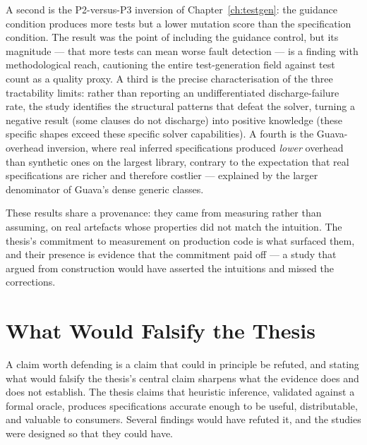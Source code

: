 A second is the P2-versus-P3 inversion of Chapter~\ref{ch:testgen}: the guidance
condition produces more tests but a lower mutation score than the specification
condition. The result was the point of including the guidance control, but its
magnitude --- that more tests can mean worse fault detection --- is a finding with
methodological reach, cautioning the entire test-generation field against test
count as a quality proxy. A third is the precise characterisation of the three
tractability limits: rather than reporting an undifferentiated discharge-failure
rate, the study identifies the structural patterns that defeat the solver, turning
a negative result (some clauses do not discharge) into positive knowledge (these
specific shapes exceed these specific solver capabilities). A fourth is the
Guava-overhead inversion, where real inferred specifications produced \emph{lower}
overhead than synthetic ones on the largest library, contrary to the expectation
that real specifications are richer and therefore costlier --- explained by the
larger denominator of Guava's dense generic classes.

These results share a provenance: they came from measuring rather than assuming,
on real artefacts whose properties did not match the intuition. The thesis's
commitment to measurement on production code is what surfaced them, and their
presence is evidence that the commitment paid off --- a study that argued from
construction would have asserted the intuitions and missed the corrections.

\section{What Would Falsify the Thesis}

A claim worth defending is a claim that could in principle be refuted, and stating
what would falsify the thesis's central claim sharpens what the evidence does and
does not establish. The thesis claims that heuristic inference, validated against a
formal oracle, produces specifications accurate enough to be useful, distributable,
and valuable to consumers. Several findings would have refuted it, and the studies
were designed so that they could have.

